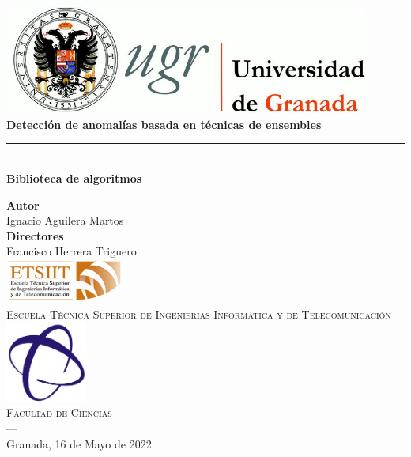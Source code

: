 \begin{titlepage}
 
 
\newlength{\centeroffset}
\setlength{\centeroffset}{-0.5\oddsidemargin}
\addtolength{\centeroffset}{0.5\evensidemargin}
\thispagestyle{empty}

\noindent\hspace*{\centeroffset}\begin{minipage}{\textwidth}

\centering
\includegraphics[width=0.9\textwidth]{imagenes/logos/logo_ugr.jpg}\\[1.4cm]

% 
{\Huge\bfseries Detección de anomalías basada en técnicas de ensembles\\
}
\noindent\rule[-1ex]{\textwidth}{3pt}\\[3.5ex]
{\large\bfseries Biblioteca de algoritmos}
\end{minipage}

\vspace{2.5cm}
\noindent\hspace*{\centeroffset}\begin{minipage}{\textwidth}
\centering

\textbf{Autor}\\ {Ignacio Aguilera Martos}\\[2.5ex]
\textbf{Directores}\\
{Francisco Herrera Triguero}\\[2cm]
\includegraphics[width=0.3\textwidth]{imagenes/logos/etsiit_logo.png}\\[0.1cm]
\textsc{Escuela Técnica Superior de Ingenierías Informática y de Telecomunicación}\\
\includegraphics[width=0.2\textwidth]{imagenes/logos/ciencias.png}\\[0.1cm]
\textsc{Facultad de Ciencias}\\
\textsc{---}\\
Granada, 16 de Mayo de 2022
\end{minipage}
\end{titlepage}


